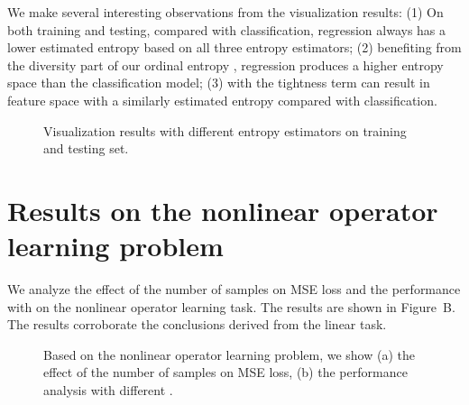 \documentclass{article} \usepackage{iclr2023_conference,times}
\begin{document}
 

We make several interesting observations from the visualization results: (1) On both training and testing, compared with classification, regression always has a lower estimated entropy based on all three entropy estimators; (2) benefiting from the diversity part of our ordinal entropy , regression produces a higher entropy space than the classification model; (3)  with the tightness term  can result in feature space with a similarly estimated entropy compared with classification. 


\begin{figure}[h]
\centering
{}
\label{fig:fig_mv}
\caption{Visualization results with different entropy estimators on training and testing set.}
\end{figure}

\section{Results on the nonlinear operator learning problem}
\label{appendix_nonlinear}
We analyze the effect of the number of samples on MSE loss and the performance with  on the nonlinear operator learning task. The results are shown in Figure~B. The results corroborate the conclusions derived from the linear task. 

\begin{figure}[h]
\centering
{}
\label{fig:result_nonlinear}
\caption{Based on the nonlinear operator learning problem, we show (a) the effect of the number of samples on MSE loss, (b) the performance analysis with different .}
\end{figure}
\end{document}

